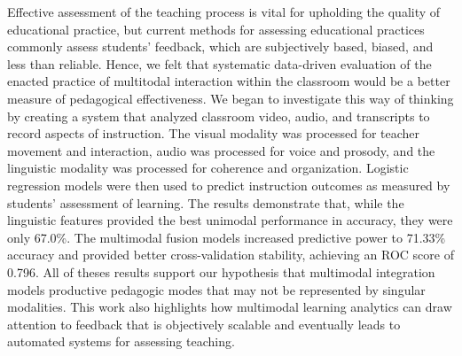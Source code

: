 \newpage
{}

Effective assessment of the teaching process is vital for upholding the quality of educational practice, but current methods for assessing educational practices commonly assess students' feedback, which are subjectively based, biased, and less than reliable. Hence, we felt that systematic data-driven evaluation of the enacted practice of multitodal interaction within the classroom would be a better measure of pedagogical effectiveness. We began to investigate this way of thinking by creating a system that analyzed classroom video, audio, and transcripts to record aspects of instruction. The visual modality was processed for teacher movement and interaction, audio was processed for voice and prosody, and the linguistic modality was processed for coherence and organization. Logistic regression models were then used to predict instruction outcomes as measured by students' assessment of learning. The results demonstrate that, while the linguistic features provided the best unimodal performance in accuracy, they were only 67.0\%. The multimodal fusion models increased predictive power to 71.33\% accuracy and provided better cross-validation stability, achieving an ROC score of 0.796. All of theses results support our hypothesis that multimodal integration models productive pedagogic modes that may not be represented by singular modalities. This work also highlights how multimodal learning analytics can draw attention to feedback that is objectively scalable and eventually leads to automated systems for assessing teaching.